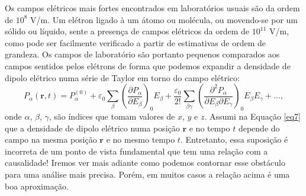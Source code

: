 \documentclass{article}
\begin{document}
Os campos elétricos mais fortes encontrados em laboratórios usuais são da ordem de $10^8$ V/m. Um elétron ligado à um átomo ou molécula, ou movendo-se por um sólido ou líquido, sente a presença de campos elétricos da ordem de $10^{11}$ V/m, como pode ser facilmente verificado a partir de estimativas de ordem de grandeza. Os campos de laboratório são portanto pequenos comparados aos campos sentidos pelos elétrons de forma que podemos expandir a densidade de dipolo elétrico numa série de Taylor em torno do campo elétrico:
\begin{equation}
    P_{\alpha}(\mathbf{r},t) = P^{(0)}_\alpha + \varepsilon_0\sum_{\beta}\left( \frac{\partial P_\alpha}{\partial E_\beta} \right)_0 E_\beta + \frac{\varepsilon_0}{2!}\sum_{\beta\gamma}\left( \frac{\partial^2 P_\alpha}{\partial E_\beta \partial E_\gamma} \right)_0 E_\beta E_\gamma + ...,
    \label{eq7}
\end{equation}
onde $\alpha$, $\beta$, $\gamma$, são índices que tomam valores de $x$, $y$ e $z$. Assumi na Equação \eqref{eq7} que a densidade de dipolo elétrico numa posição $\mathbf{r}$ e no tempo $t$ depende do campo na mesma posição $\mathbf{r}$ e no mesmo tempo $t$. Entretanto, essa suposição é incorreta de um ponto de vista fundamental que tem uma relação com a causalidade! Iremos ver mais adiante como podemos contornar esse obstáculo para uma análise mais precisa. Porém, em muitos casos a relação acima é uma boa aproximação.
\end{document}
